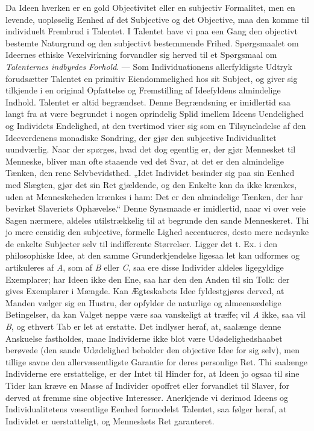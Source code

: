 \documentclass[12pt]{book}
\newcommand{\opage}[1]{\marginnote{\footnotesize\textit{[#1]}}}
\begin{document}
Da Ideen hverken er en gold Objectivitet eller en subjectiv Formalitet, men en
levende, uopløselig Eenhed af det Subjective og det Objective, maa den komme til
individuelt Frembrud i Talentet. I Talentet have vi paa een Gang den objectivt
bestemte Naturgrund og den subjectivt bestemmende Frihed. Spørgsmaalet om Ideernes
ethiske Vexelvirkning forvandler sig herved til et Spørgsmaal om
\emph{Talenternes indbyrdes Forhold}. --- Som Individuationens allerfyldigste Udtryk
forudsætter Talentet en primitiv Eiendommelighed hos sit Subject, og giver sig
tilkjende i en original Opfattelse og Fremstilling af Ideefyldens almindelige
Indhold. Talentet er altid begrændset. Denne Begrændsning er imidlertid saa langt
fra at være begrundet i nogen oprindelig Splid imellem Ideens Uendelighed og
Individets Endelighed, at den tvertimod viser sig som en Tilsyneladelse af den
Ideeverdenens monadiske Sondring, der gjør den subjective Individualitet
uundværlig. Naar der spørges, hvad det dog egentlig er, der gjør Mennesket til
Menneske, bliver man ofte staaende ved det Svar, at det er den almindelige Tænken,
den rene Selvbevidsthed. „Idet Individet besinder sig paa sin Eenhed med Slægten,
gjør det sin Ret gjældende, og den Enkelte kan da ikke krænkes, uden at
Menneskeheden krænkes i ham: Det er den almindelige Tænken, der har bevirket
Slaveriets Ophævelse.“ Denne Synsmaade er imidlertid, naar vi over%
\opage{271}veie Sagen nærmere, aldeles utilstrækkelig til at begrunde den sande Menneskeret.
Thi jo mere eensidig den subjective, formelle Lighed accentueres, desto mere
nedsynke de enkelte Subjecter selv til indifferente Størrelser. Ligger det t. Ex. i
den philosophiske Idee, at den samme Grunderkjendelse ligesaa let kan udformes og
artikuleres af \textit{A}, som af \textit{B} eller \textit{C}, saa ere disse
Individer aldeles ligegyldige Exemplarer; har Ideen ikke den Ene, saa har den den
Anden til sin Tolk: der gives Exemplarer i Mængde. Kan Ægteskabets Idee
fyldestgjøres derved, at Manden vælger sig en Hustru, der opfylder de naturlige og
almeensædelige Betingelser, da kan Valget neppe være saa vanskeligt at træffe; vil
\textit{A} ikke, saa vil \textit{B}, og ethvert Tab er let at erstatte. Det
indlyser heraf, at, saalænge denne Anskuelse fastholdes, maae Individerne ikke blot
være Udødelighedshaabet berøvede (den sande Udødelighed beholder den objective Idee
for sig selv), men tillige savne den allervæsentligste Garantie for deres personlige
Ret. Thi saalænge Individerne ere erstattelige, er der Intet til Hinder for, at
Ideen jo ogsaa til sine Tider kan kræve en Masse af Individer opoffret eller
forvandlet til Slaver, for derved at fremme sine objective Interesser. Anerkjende vi
derimod Ideens og Individualitetens væsentlige Eenhed formedelst Talentet, saa
følger heraf, at Individet er uerstatteligt, og Menneskets Ret garanteret.
\end{document}
